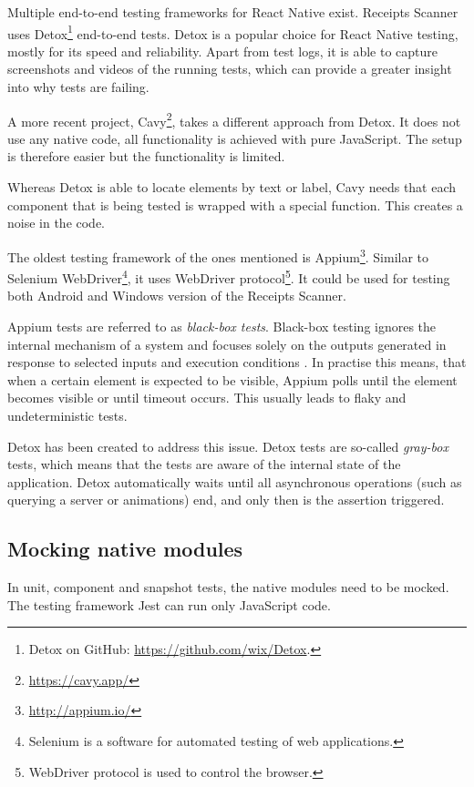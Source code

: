 \documentclass[
  digital, %
  table,   %
  oneside, %
  lof,     %
  lot,     %
]{fithesis3}
\begin{document}
Multiple end-to-end testing frameworks for React Native exist.
Receipts Scanner uses Detox\footnote{Detox on GitHub: \url{https://github.com/wix/Detox}.} end-to-end tests. Detox is a popular choice for React Native testing, mostly for its speed and reliability. Apart from test logs, it is able to capture screenshots and videos of the running tests, which can provide a greater insight into why tests are failing.

A more recent project, Cavy\footnote{\url{https://cavy.app/}}, takes a different approach from Detox. It does not use any native code, all functionality is achieved with pure JavaScript. The setup is therefore easier but the functionality is limited. 

Whereas Detox is able to locate elements by text or label, Cavy needs that each component that is being tested is wrapped with a special function. This creates a noise in the code.

The oldest testing framework of the ones mentioned is Appium\footnote{\url{http://appium.io/}}. Similar to Selenium WebDriver\footnote{Selenium is a software for automated testing of web applications.}, it uses WebDriver protocol\footnote{WebDriver protocol is used to control the browser.}. It could be used for testing both Android and Windows version of the Receipts Scanner.

Appium tests are referred to as \textit{black-box tests}. Black-box testing ignores the internal mechanism of a system and focuses solely on the outputs generated in response to selected inputs and execution conditions \cite{Gao2003Testing}. In practise this means, that when a certain element is expected to be visible, Appium polls until the element becomes visible or until timeout occurs. This usually leads to flaky and undeterministic tests.

Detox has been created to address this issue. Detox tests are so-called \textit{gray-box} tests, which means that the tests are aware of the internal state of the application. Detox automatically waits until all asynchronous operations (such as querying a server or animations) end, and only then is the assertion triggered.

\subsection{Mocking native modules}
In unit, component and snapshot tests, the native modules need to be mocked. The testing framework Jest can run only JavaScript code.
\end{document}
